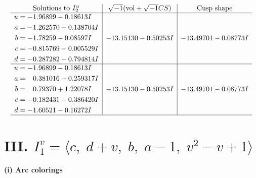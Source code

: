 \documentclass[1p]{elsarticle_modified}
\theoremstyle{definition}
\newcommand{\I}{\sqrt{-1}}
\begin{document}
$$\begin{array}{c|c|c}
\text{Solutions to }I^u_{2}& \I (\text{vol} + \sqrt{-1}CS) & \text{Cusp shape}\\
 \hline 
\begin{aligned}
u &= -1.96899 - 0.18613 I \\
a &= -1.262570 + 0.138704 I \\
b &= -1.78259 - 0.08597 I \\
c &= -0.815769 - 0.005529 I \\
d &= -0.287282 - 0.794814 I\end{aligned}
 & -13.15130 - 0.50253 I & -13.49701 - 0.08773 I \\ \hline\begin{aligned}
u &= -1.96899 - 0.18613 I \\
a &= \phantom{-}0.381016 - 0.259317 I \\
b &= \phantom{-}0.79370 + 1.22078 I \\
c &= -0.182431 - 0.386420 I \\
d &= -1.60521 - 0.16272 I\end{aligned}
 & -13.15130 - 0.50253 I & -13.49701 - 0.08773 I\\
 \hline 
 \end{array}$$\newpage\newpage\renewcommand{\arraystretch}{1}
\centering \section*{III. $I^v_{1}= \langle c,\;d+v,\;b,\;a-1,\;v^2- v+1 \rangle$}
\flushleft \textbf{(i) Arc colorings}\\
\end{document}
